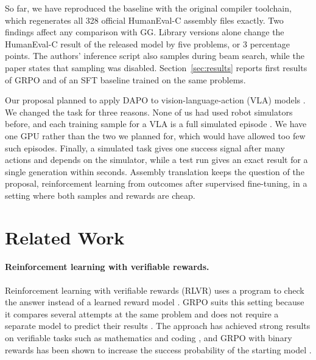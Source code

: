 \documentclass{article}
\begin{document}
So far, we have reproduced the baseline with the original compiler toolchain, which regenerates all 328 official HumanEval-C assembly files exactly. Two findings affect any comparison with GG. Library versions alone change the HumanEval-C result of the released model by five problems, or 3 percentage points. The authors' inference script also samples during beam search, while the paper states that sampling was disabled.  Section~\ref{sec:results} reports first results of GRPO and of an SFT baseline trained on the same problems.

Our proposal planned to apply DAPO to vision-language-action (VLA) models \citep{dapo}. We changed the task for three reasons. None of us had used robot simulators before, and each training sample for a VLA is a full simulated episode \citep{simplevlarl,vlarl,rlinfvla}. We have one GPU rather than the two we planned for, which would have allowed too few such episodes. Finally, a simulated task gives one success signal after many actions and depends on the simulator, while a test run gives an exact result for a single generation within seconds. Assembly translation keeps the question of the proposal, reinforcement learning from outcomes after supervised fine-tuning, in a setting where both samples and rewards are cheap.

\section{Related Work}
\label{sec:related}

\paragraph{Reinforcement learning with verifiable rewards.}
Reinforcement learning with verifiable rewards (RLVR) uses a program to check the answer instead of a learned reward model \citep{tulu3}. GRPO suits this setting because it compares several attempts at the same problem and does not require a separate model to predict their results \citep{deepseekmath}. The approach has achieved strong results on verifiable tasks such as mathematics and coding \citep{deepseekr1}, and GRPO with binary rewards has been shown to increase the success probability of the starting model \citep{mroueh2025grpo}.
\end{document}
